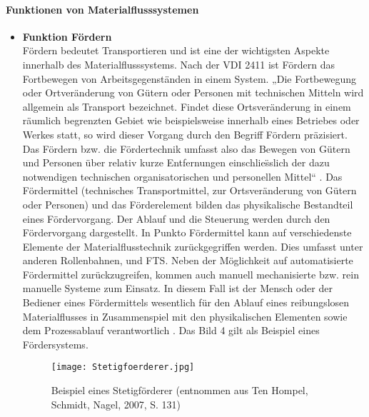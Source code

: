 \paragraph{Funktionen von Materialflusssystemen}
\begin{itemize}
	\item \textbf{Funktion F\"ordern} \\
	F\"ordern bedeutet Transportieren und ist eine der wichtigsten Aspekte innerhalb des Materialflusssystems. Nach der VDI 2411 ist F\"ordern das Fortbewegen von Arbeitsgegenst\"anden in einem System. „Die Fortbewegung oder Ortver\"anderung von G\"utern oder Personen mit technischen Mitteln wird allgemein als Transport bezeichnet. Findet diese Ortsver\"anderung in einem r\"aumlich begrenzten Gebiet wie beispielsweise innerhalb eines Betriebes oder Werkes statt, so wird dieser Vorgang durch den Begriff F\"ordern pr\"azisiert. Das F\"ordern bzw. die F\"ordertechnik umfasst also das Bewegen von G\"utern und Personen \"uber relativ kurze Entfernungen einschlie\"sslich der dazu notwendigen technischen organisatorischen und personellen Mittel“ \cite[S. 119]{Hompel:Schmidt:Nagel:2007}. 
Das F\"ordermittel (technisches Transportmittel, zur Ortsver\"anderung von G\"utern oder Personen) und das F\"orderelement bilden das physikalische Bestandteil eines F\"ordervorgang. Der Ablauf und die Steuerung werden durch den F\"ordervorgang dargestellt. In Punkto F\"ordermittel kann auf verschiedenste Elemente der Materialflusstechnik zur\"uckgegriffen werden. Dies umfasst unter anderen Rollenbahnen, und FTS. Neben der M\"oglichkeit auf automatisierte F\"ordermittel zur\"uckzugreifen, kommen auch manuell mechanisierte bzw. rein manuelle Systeme zum Einsatz. In diesem Fall ist der Mensch oder der Bediener eines F\"ordermittels wesentlich f\"ur den Ablauf eines reibungslosen Materialflusses in Zusammenspiel mit den physikalischen Elementen sowie dem Prozessablauf verantwortlich \cite[S. 8]{Wulz:Johannes:2008}. Das Bild 4 gilt als Beispiel eines F\"ordersystems. 
	\begin{figure}[h!]
	\centering
  \texttt{[image: Stetigfoerderer.jpg]}
	\caption{Beispiel eines Stetigf\"orderer (entnommen aus Ten Hompel, Schmidt, Nagel, 2007, S. 131)}
	\label{Stetigfoerderer}
\end{figure}


\end{itemize}

